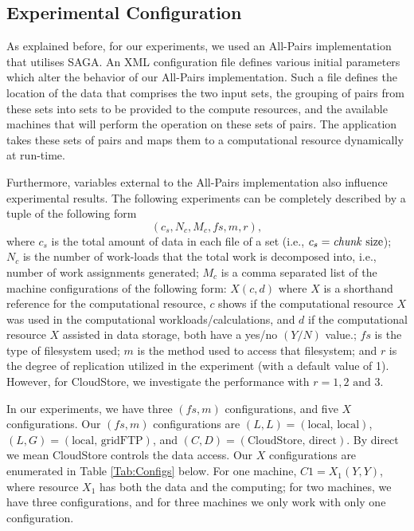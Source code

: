\documentclass{rspublic}
\begin{document}
\subsection{Experimental Configuration}

As explained before, for our experiments, we used an All-Pairs
implementation that utilises SAGA. An XML configuration file defines
various initial parameters which alter the behavior of our All-Pairs
implementation.  Such a file defines the location of the data that
comprises the two input sets, the grouping of pairs from these sets into
sets to be provided to the compute resources, and the available machines
that will perform the operation on these sets of pairs. The application
takes these sets of pairs and maps them to a computational resource
dynamically at run-time.  

Furthermore, variables external to the All-Pairs implementation also
influence experimental results. The following experiments can be
completely described by a tuple of the following form
 \begin{equation}
(c_s, N_c, M_c, fs, m,r),
\label{Eq:tuple}
\end{equation}
where $c_s$ is the total amount of data in each file of a set (i.e.,
$c_s=\mbox{\textit{chunk} size}$); $N_c$ is the number of work-loads
that the total work is decomposed into, i.e., number of work
assignments generated; $M_c$ is a comma separated list of the machine 
configurations of the
following form: $X(c, d)$ where $X$ is a shorthand reference for the
computational resource, $c$ shows if the computational resource $X$
was used in the computational workloads/calculations, and $d$ if the
computational resource $X$ assisted in data storage, both have a
yes/no $(Y/N)$ value.; $fs$ is the type of filesystem used; $m$ is the
method used to access that filesystem; and $r$ is the degree of
replication utilized in the experiment (with a default value of 1).
 However, for CloudStore, we investigate the performance with 
 $r = 1, 2 \mbox{ and } 3$.

In our experiments, we have three $(fs, m)$ configurations, and five $X$
configurations. Our $(fs, m)$ configurations are $(L,L)=(\mbox{local,
local})$, $(L,G)=(\mbox{local, gridFTP})$, and $(C,D)=(\mbox{CloudStore,
direct})$. By direct we mean CloudStore controls the data access.
 Our $X$ configurations are enumerated in Table
\ref{Tab:Configs} below.  For one machine, $C1=X_1(Y,Y)$, where resource
$X_1$ has both the data and the computing; for two machines, we have
three configurations, and for three machines we only work with only one
configuration.
\end{document}
